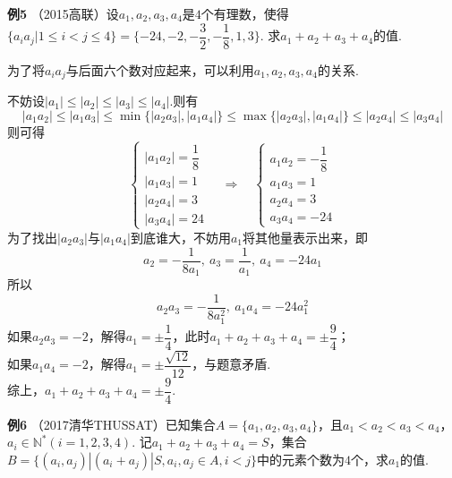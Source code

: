 \documentclass[lang=cn, zihao=4.5]{elegantbook}
\begin{document}
	
\newpage
\noindent %
	\textbf{例5} \quad （2015高联）设$a_1,a_2,a_3,a_4$是$4$个有理数，使得$\{a_ia_j|1 \leq i < j \leq 4 \}=\{-24,-2,-\dfrac{3}{2},-\dfrac{1}{8},1,3\}$. 求$a_1+a_2+a_3+a_4$的值.

\begin{hint}
	为了将$a_ia_j$与后面六个数对应起来，可以利用$a_1,a_2,a_3,a_4$的关系.
\end{hint}
\begin{solution}
	不妨设$|a_1| \leq |a_2| \leq |a_3| \leq |a_4|$.则有$$|a_1a_2| \leq |a_1a_3| \leq \min \{ |a_2a_3|,|a_1a_4| \} \leq \max \{ |a_2a_3|,|a_1a_4| \} \leq |a_2a_4| \leq |a_3a_4|$$
	则可得$$
	\begin{cases}
		|a_1a_2| = \dfrac{1}{8} \\
		|a_1a_3| = 1 \\
		|a_2a_4| = 3 \\
		|a_3a_4| = 24
	\end{cases}
	\quad \Longrightarrow \quad
	\begin{cases}
		a_1a_2 = -\dfrac{1}{8} \\
		a_1a_3 = 1 \\
		a_2a_4 = 3 \\
		a_3a_4 = -24
	\end{cases}
	$$
	为了找出$|a_2a_3|$与$|a_1a_4|$到底谁大，不妨用$a_1$将其他量表示出来，即$$a_2 = -\frac{1}{8a_1} , \ a_3=\frac{1}{a_1} , \ a_4=-24a_1$$
	所以$$a_2a_3 = -\frac{1}{8a_1^2} , \ a_1a_4 = -24a_1^2$$
	如果$a_2a_3 = -2$，解得$a_1 = \pm \dfrac{1}{4}$，此时$a_1+a_2+a_3+a_4 = \pm \dfrac{9}{4}$； \\
	如果$a_1a_4 = -2$，解得$a_1 = \pm \dfrac{\sqrt{12}}{12}$，与题意矛盾. \\
	综上，$a_1+a_2+a_3+a_4 = \pm \dfrac{9}{4}$.
\end{solution}

\newpage
\noindent %
	\textbf{例6} \quad （2017清华THUSSAT）已知集合$A=\{a_1,a_2,a_3,a_4\}$，且$a_1<a_2<a_3<a_4$，$a_i \in \mathbb{N}^{*} (i=1,2,3,4)$. 记$a_1+a_2+a_3+a_4=S$，集合$B=\{(a_i,a_j)|(a_i+a_j)|S,a_i,a_j\in A , i<j\}$中的元素个数为$4$个，求$a_1$的值.
	
\end{document}
